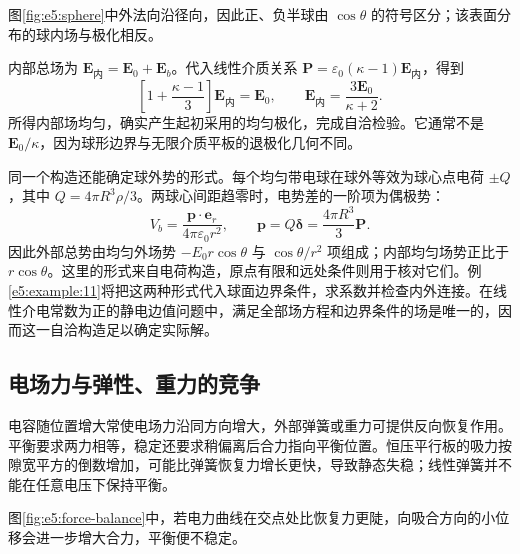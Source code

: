 \par 图\ref{fig:e5:sphere}中外法向沿径向，因此正、负半球由 $\cos\theta$ 的符号区分；该表面分布的球内场与极化相反。

内部总场为 $\bm E_{\text{内}}=\bm E_0+\bm E_b$。代入线性介质关系 $\bm P=\varepsilon_0(\kappa-1)\bm E_{\text{内}}$，得到
\[
\left[1+\frac{\kappa-1}{3}\right]\bm E_{\text{内}}=\bm E_0,
\qquad \bm E_{\text{内}}=\frac{3\bm E_0}{\kappa+2}.
\]
所得内部场均匀，确实产生起初采用的均匀极化，完成自洽检验。它通常不是 $\bm E_0/\kappa$，因为球形边界与无限介质平板的退极化几何不同。

同一个构造还能确定球外势的形式。每个均匀带电球在球外等效为球心点电荷 $\pm Q$，其中 $Q=4\pi R^3\rho/3$。两球心间距趋零时，电势差的一阶项为偶极势：
\[
V_b=\frac{\bm p\cdot\bm e_r}{4\pi\varepsilon_0r^2},\qquad
\bm p=Q\bm\delta=\frac{4\pi R^3}{3}\bm P.
\]
因此外部总势由均匀外场势 $-E_0r\cos\theta$ 与 $\cos\theta/r^2$ 项组成；内部均匀场势正比于 $r\cos\theta$。这里的形式来自电荷构造，原点有限和远处条件则用于核对它们。例\ref{e5:example:11}将把这两种形式代入球面边界条件，求系数并检查内外连接。在线性介电常数为正的静电边值问题中，满足全部场方程和边界条件的场是唯一的，因而这一自洽构造足以确定实际解。

\subsection{电场力与弹性、重力的竞争}

电容随位置增大常使电场力沿同方向增大，外部弹簧或重力可提供反向恢复作用。平衡要求两力相等，稳定还要求稍偏离后合力指向平衡位置。恒压平行板的吸力按隙宽平方的倒数增加，可能比弹簧恢复力增长更快，导致静态失稳；线性弹簧并不能在任意电压下保持平衡。

\par 图\ref{fig:e5:force-balance}中，若电力曲线在交点处比恢复力更陡，向吸合方向的小位移会进一步增大合力，平衡便不稳定。

